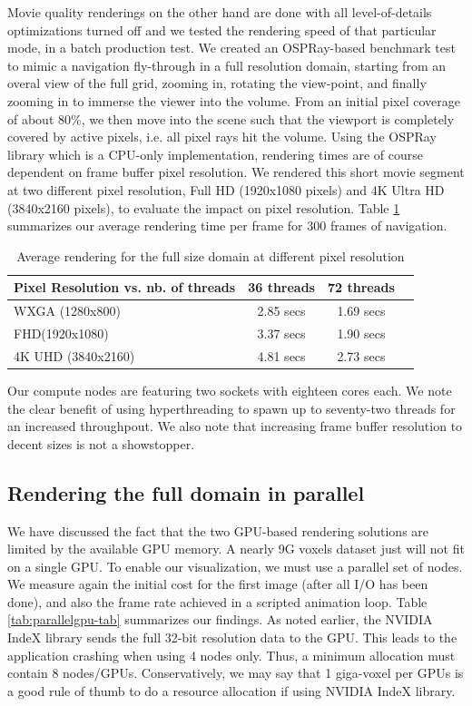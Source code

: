\documentclass[final,5p,times,twocolumn]{elsarticle}
\begin{document}
Movie quality renderings on the other hand are done with all level-of-details optimizations turned off and we tested the rendering speed of that particular mode, in a batch production test.
We created an OSPRay-based benchmark test to mimic a navigation fly-through in
a full resolution domain, starting from an overal view of the full grid, zooming in, rotating
the view-point, and finally zooming in to immerse the viewer into the volume. From
an initial pixel coverage of about 80\%, we then move into the scene such that
the viewport is completely covered by active pixels, i.e. all pixel rays hit the volume.  Using the OSPRay library which is a CPU-only implementation, rendering times are of course dependent on frame buffer pixel resolution. We rendered this short movie segment at two different pixel resolution, Full HD (1920x1080 pixels) and 4K Ultra HD (3840x2160 pixels), to evaluate the impact on pixel resolution.
Table \ref{tab:osprayThreads} summarizes
our average rendering time per frame for 300 frames of navigation.

\begin{table}[htb]
  \centering
  \caption{
    Average rendering for the full size domain at different pixel resolution
  }
  \label{tab:osprayThreads}

  \begin{tabular}{lccc}
    \hline
    Pixel Resolution vs. nb. of threads  & 36 threads & 72 threads\\
    \hline
    WXGA (1280x800) & 2.85 secs &  1.69 secs \\
    FHD(1920x1080) & 3.37 secs &  1.90 secs \\
    4K UHD (3840x2160) & 4.81 secs &  2.73 secs \\
    \hline

  \end{tabular}
\end{table}

Our compute nodes are featuring two sockets with eighteen cores each. We note the clear benefit of using hyperthreading to spawn up to seventy-two threads for an increased throughpout. We also note that increasing frame buffer resolution to decent sizes is not a showstopper. 

\subsection{Rendering the full domain in parallel}

We have discussed the fact that the two GPU-based rendering solutions
are limited by the available GPU memory. A nearly 9G voxels dataset just will
not fit on a single GPU. To enable our visualization, we must use a parallel 
set of nodes. We measure again the initial cost for the first image
(after all I/O has been done), and also the frame rate achieved in a scripted
animation loop. Table \ref{tab:parallelgpu-tab} summarizes our findings. As noted earlier,
the NVIDIA IndeX library sends the full 32-bit resolution data to the GPU. This
leads to the application crashing when using 4 nodes only. Thus, a minimum
allocation must contain 8 nodes/GPUs. Conservatively, we may say that 1 giga-voxel
per GPUs is a good rule of thumb to do a resource allocation if using NVIDIA IndeX library.
\end{document}
